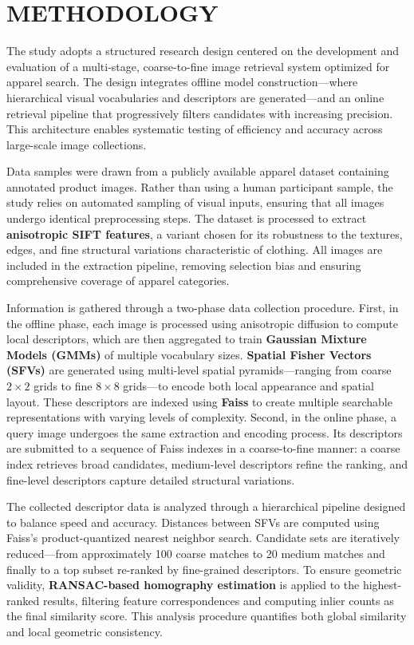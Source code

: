 \documentclass[conference]{IEEEtran}
\begin{document}
\section{METHODOLOGY}
The study adopts a structured research design centered on the development and evaluation of a multi-stage, coarse-to-fine image retrieval system optimized for apparel search. The design integrates offline model construction—where hierarchical visual vocabularies and descriptors are generated—and an online retrieval pipeline that progressively filters candidates with increasing precision. This architecture enables systematic testing of efficiency and accuracy across large-scale image collections.

Data samples were drawn from a publicly available apparel dataset containing annotated product images. Rather than using a human participant sample, the study relies on automated sampling of visual inputs, ensuring that all images undergo identical preprocessing steps. The dataset is processed to extract \textbf{anisotropic SIFT features}, a variant chosen for its robustness to the textures, edges, and fine structural variations characteristic of clothing. All images are included in the extraction pipeline, removing selection bias and ensuring comprehensive coverage of apparel categories.

Information is gathered through a two-phase data collection procedure. First, in the offline phase, each image is processed using anisotropic diffusion to compute local descriptors, which are then aggregated to train \textbf{Gaussian Mixture Models (GMMs)} of multiple vocabulary sizes. \textbf{Spatial Fisher Vectors (SFVs)} are generated using multi-level spatial pyramids—ranging from coarse $2\times2$ grids to fine $8\times8$ grids—to encode both local appearance and spatial layout. These descriptors are indexed using \textbf{Faiss} to create multiple searchable representations with varying levels of complexity. Second, in the online phase, a query image undergoes the same extraction and encoding process. Its descriptors are submitted to a sequence of Faiss indexes in a coarse-to-fine manner: a coarse index retrieves broad candidates, medium-level descriptors refine the ranking, and fine-level descriptors capture detailed structural variations.

The collected descriptor data is analyzed through a hierarchical pipeline designed to balance speed and accuracy. Distances between SFVs are computed using Faiss’s product-quantized nearest neighbor search. Candidate sets are iteratively reduced—from approximately 100 coarse matches to 20 medium matches and finally to a top subset re-ranked by fine-grained descriptors. To ensure geometric validity, \textbf{RANSAC-based homography estimation} is applied to the highest-ranked results, filtering feature correspondences and computing inlier counts as the final similarity score. This analysis procedure quantifies both global similarity and local geometric consistency.
\end{document}
